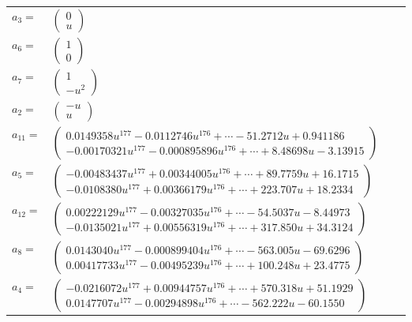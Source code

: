 \documentclass[1p]{elsarticle_modified}
\theoremstyle{definition}
\begin{document}
\begin{tabular}{m{7pt} m{180pt} m{7pt} m{180pt} }
\flushright $a_{3}=$&$\begin{pmatrix}0\\u\end{pmatrix}$ \\
\flushright $a_{6}=$&$\begin{pmatrix}1\\0\end{pmatrix}$ \\
\flushright $a_{7}=$&$\begin{pmatrix}1\\- u^2\end{pmatrix}$ \\
\flushright $a_{2}=$&$\begin{pmatrix}- u\\u\end{pmatrix}$ \\
\flushright $a_{11}=$&$\begin{pmatrix}0.0149358 u^{177}-0.0112746 u^{176}+\cdots-51.2712 u+0.941186\\-0.00170321 u^{177}-0.000895896 u^{176}+\cdots+8.48698 u-3.13915\end{pmatrix}$ \\
\flushright $a_{5}=$&$\begin{pmatrix}-0.00483437 u^{177}+0.00344005 u^{176}+\cdots+89.7759 u+16.1715\\-0.0108380 u^{177}+0.00366179 u^{176}+\cdots+223.707 u+18.2334\end{pmatrix}$ \\
\flushright $a_{12}=$&$\begin{pmatrix}0.00222129 u^{177}-0.00327035 u^{176}+\cdots-54.5037 u-8.44973\\-0.0135021 u^{177}+0.00556319 u^{176}+\cdots+317.850 u+34.3124\end{pmatrix}$ \\
\flushright $a_{8}=$&$\begin{pmatrix}0.0143040 u^{177}-0.000899404 u^{176}+\cdots-563.005 u-69.6296\\0.00417733 u^{177}-0.00495239 u^{176}+\cdots+100.248 u+23.4775\end{pmatrix}$ \\
\flushright $a_{4}=$&$\begin{pmatrix}-0.0216072 u^{177}+0.00944757 u^{176}+\cdots+570.318 u+51.1929\\0.0147707 u^{177}-0.00294898 u^{176}+\cdots-562.222 u-60.1550\end{pmatrix}$ \\

\end{tabular}
\end{document}

